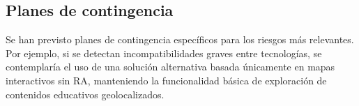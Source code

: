 \subsection{Planes de contingencia}

Se han previsto planes de contingencia específicos para los riesgos más relevantes. Por ejemplo, si se detectan incompatibilidades graves entre tecnologías, se contemplaría el uso de una solución alternativa basada únicamente en mapas interactivos sin RA, manteniendo la funcionalidad básica de exploración de contenidos educativos geolocalizados.

